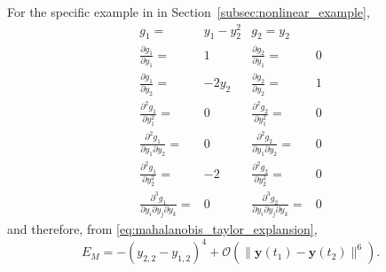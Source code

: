 For the specific example in in Section~\ref{subsec:nonlinear_example}, 
\begin{equation}
\begin{aligned}
g_1 =& y_1 - y_2^2 
&
g_2 = y_2 
\\
\frac{\partial g_1}{\partial y_1} =& 1
&
\frac{\partial g_2}{\partial y_1} =& 0
\\
\frac{\partial g_1}{\partial y_2} =& -2 y_2
&
\frac{\partial g_2}{\partial y_2} =& 1
\\
\frac{\partial^2 g_1}{\partial y_1^2} =& 0
&
\frac{\partial^2 g_2}{\partial y_1^2} =& 0
\\
\frac{\partial^2 g_1}{\partial y_1 \partial y_2} =& 0
&
\frac{\partial^2 g_2}{\partial y_1 \partial y_2} =& 0
\\
\frac{\partial^2 g_1}{\partial y_2^2} =& -2
&
\frac{\partial^2 g_2}{\partial y_2^2} =& 0
\\
\frac{\partial^3 g_1}{\partial y_i \partial y_j \partial y_k} =& 0
&
\frac{\partial^3 g_2}{\partial y_i \partial y_j \partial y_k} =& 0
\end{aligned}
\end{equation}
%
and therefore, from \eqref{eq:mahalanobis_taylor_explansion},
%
\begin{equation}
E_M =
 -(y_{2,2} - y_{1,2})^4
 + \mathcal{O} (\|\mathbf{y}(t_1) - \mathbf{y}(t_2) \|^6 ) .
\end{equation}

